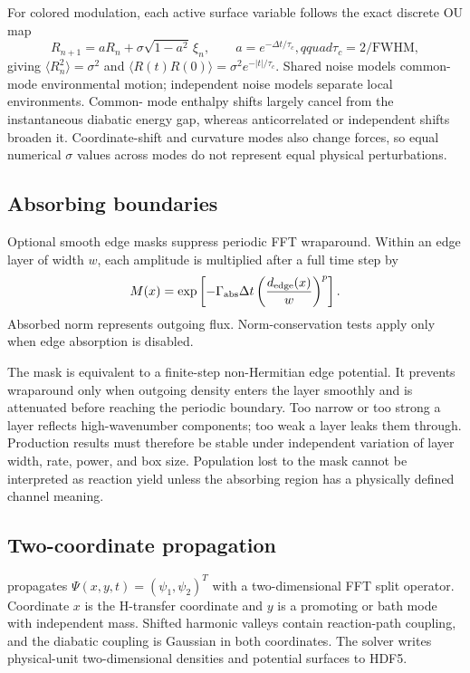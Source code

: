\documentclass[11pt]{article}
\newcommand{\code}[1]{\texttt{\detokenize{#1}}}
\begin{document}
For colored modulation, each active surface variable follows the exact discrete OU
map
\begin{equation}
 R_{n+1}=aR_n+\sigma\sqrt{1-a^2}\,\xi_n,\qquad
 a=e^{-\Delta t/\tau_c},qquad \tau_c=2/\mathrm{FWHM},
\end{equation}
giving $\langle R_n^2\rangle=\sigma^2$ and
$\langle R(t)R(0)\rangle=\sigma^2e^{-|t|/\tau_c}$. Shared noise models common-mode
environmental motion; independent noise models separate local environments. Common-
mode enthalpy shifts largely cancel from the instantaneous diabatic energy gap,
whereas anticorrelated or independent shifts broaden it. Coordinate-shift and
curvature modes also change forces, so equal numerical $\sigma$ values across modes
do not represent equal physical perturbations.

\subsection{Absorbing boundaries}

Optional smooth edge masks suppress periodic FFT wraparound. Within an edge
layer of width $w$, each amplitude is multiplied after a full time step by
\begin{equation}
  M(x)=\exp\left[-\Gamma_{\rm abs}\Delta t
  \left(\frac{d_{\rm edge}(x)}{w}\right)^p\right].
\end{equation}
Absorbed norm represents outgoing flux. Norm-conservation tests apply only when
edge absorption is disabled.

The mask is equivalent to a finite-step non-Hermitian edge potential. It prevents
wraparound only when outgoing density enters the layer smoothly and is attenuated
before reaching the periodic boundary. Too narrow or too strong a layer reflects
high-wavenumber components; too weak a layer leaks them through. Production results
must therefore be stable under independent variation of layer width, rate, power,
and box size. Population lost to the mask cannot be interpreted as reaction yield
unless the absorbing region has a physically defined channel meaning.

\subsection{Two-coordinate propagation}

\code{multidimensional_transfer.py} propagates
$\Psi(x,y,t)=(\psi_1,\psi_2)^T$ with a two-dimensional FFT split operator.
Coordinate $x$ is the H-transfer coordinate and $y$ is a promoting or bath mode
with independent mass. Shifted harmonic valleys contain reaction-path coupling,
and the diabatic coupling is Gaussian in both coordinates. The solver writes
physical-unit two-dimensional densities and potential surfaces to HDF5.
\end{document}
